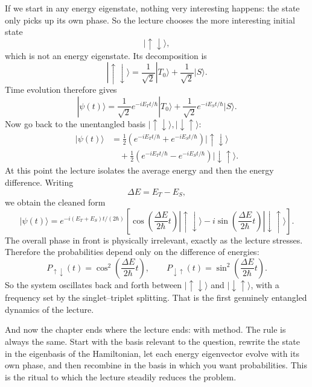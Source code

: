 If we start in any energy eigenstate, nothing very interesting happens: the state only picks up its own phase. So the lecture chooses the more interesting initial state
\begin{equation}
|\uparrow\downarrow\rangle,
\end{equation}
which is not an energy eigenstate. Its decomposition is
\begin{equation}
|\uparrow\downarrow\rangle
=
\frac{1}{\sqrt2}|T_0\rangle
+
\frac{1}{\sqrt2}|S\rangle.
\end{equation}
Time evolution therefore gives
\begin{equation}
|\psi(t)\rangle
=
\frac{1}{\sqrt2}e^{-iE_T t/\hbar}|T_0\rangle
+
\frac{1}{\sqrt2}e^{-iE_S t/\hbar}|S\rangle.
\end{equation}
Now go back to the unentangled basis \(|\uparrow\downarrow\rangle,|\downarrow\uparrow\rangle\):
\begin{align}
|\psi(t)\rangle
&=
\frac12\left(e^{-iE_T t/\hbar}+e^{-iE_S t/\hbar}\right)|\uparrow\downarrow\rangle \\
&\quad
+
\frac12\left(e^{-iE_T t/\hbar}-e^{-iE_S t/\hbar}\right)|\downarrow\uparrow\rangle.
\end{align}
At this point the lecture isolates the average energy and then the energy difference. Writing
\begin{equation}
\Delta E=E_T-E_S,
\end{equation}
we obtain the cleaned form
\begin{equation}
|\psi(t)\rangle
=
e^{-i(E_T+E_S)t/(2\hbar)}
\left[
\cos\!\left(\frac{\Delta E}{2\hbar}t\right)|\uparrow\downarrow\rangle
-
i\sin\!\left(\frac{\Delta E}{2\hbar}t\right)|\downarrow\uparrow\rangle
\right].
\end{equation}
The overall phase in front is physically irrelevant, exactly as the lecture stresses. Therefore the probabilities depend only on the difference of energies:
\begin{equation}
P_{\uparrow\downarrow}(t)
=
\cos^2\!\left(\frac{\Delta E}{2\hbar}t\right),
\qquad
P_{\downarrow\uparrow}(t)
=
\sin^2\!\left(\frac{\Delta E}{2\hbar}t\right).
\end{equation}
So the system oscillates back and forth between \(|\uparrow\downarrow\rangle\) and \(|\downarrow\uparrow\rangle\), with a frequency set by the singlet--triplet splitting. That is the first genuinely entangled dynamics of the lecture.

And now the chapter ends where the lecture ends: with method. The rule is always the same. Start with the basis relevant to the question, rewrite the state in the eigenbasis of the Hamiltonian, let each energy eigenvector evolve with its own phase, and then recombine in the basis in which you want probabilities. This is the ritual to which the lecture steadily reduces the problem.

